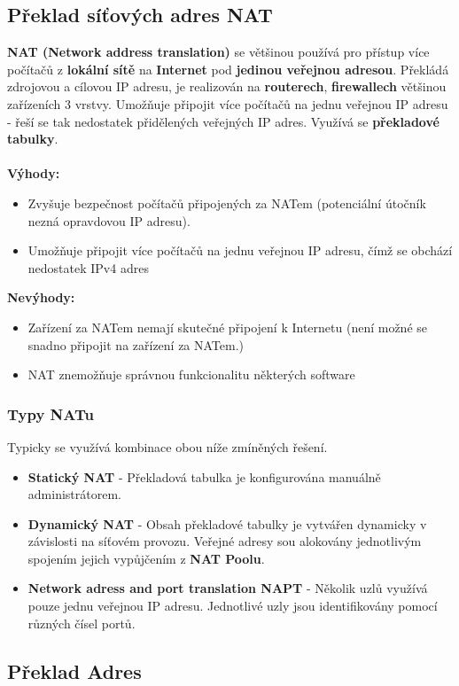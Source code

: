 \subsection{Překlad síťových adres NAT}
\textbf{NAT (Network address translation)} se většinou používá pro přístup více počítačů z \textbf{lokální sítě} na \textbf{Internet} pod \textbf{jedinou veřejnou adresou}. Překládá zdrojovou a cílovou IP adresu, je realizován na \textbf{routerech}, \textbf{firewallech} většinou zařízeních 3 vrstvy. Umožňuje připojit více počítačů na jednu veřejnou IP adresu - řeší se tak nedostatek přidělených veřejných IP adres. Využívá se \textbf{překladové tabulky}. 
\\\\
\textbf{Výhody:} 
\begin{itemize}
	\item Zvyšuje bezpečnost počítačů připojených za NATem (potenciální útočník nezná opravdovou IP adresu). 
	\item Umožňuje připojit více počítačů na jednu veřejnou IP adresu, čímž se obchází nedostatek IPv4 adres
\end{itemize}
\textbf{Nevýhody:}
\begin{itemize}
	\item Zařízení za NATem nemají skutečné připojení k Internetu (není možné se snadno připojit na zařízení za NATem.)
	\item NAT znemožňuje správnou funkcionalitu některých software
\end{itemize}

\subsubsection{Typy NATu}
Typicky se využívá kombinace obou níže zmíněných řešení.
\begin{itemize}
	\item \textbf{Statický NAT} - Překladová tabulka je konfigurována manuálně administrátorem.
	\item \textbf{Dynamický NAT} - Obsah překladové tabulky je vytvářen dynamicky v závislosti na síťovém provozu. Veřejné adresy sou alokovány jednotlivým spojením jejich vypůjčením z \textbf{NAT Poolu}.
	\item \textbf{Network adress and port translation NAPT} - Několik uzlů využívá pouze jednu veřejnou IP adresu. Jednotlivé uzly jsou identifikovány pomocí různých čísel portů.
\end{itemize}

\subsection{Překlad Adres}

